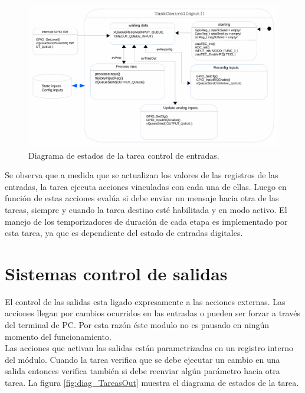 \begin{figure}[h!]
	\hspace{-0.5cm}
	\includegraphics[width=1.05\textwidth]{Figures/Cap_3/diagrama_tarea_input}
	\caption{ Diagrama de estados de la tarea control de entradas. }
	\label{fig:diag_TareasInp}
\end{figure}

Se observa que a medida que se actualizan los valores de las registros de las entradas, la tarea ejecuta acciones vinculadas con cada una de ellas. Luego en función de estas acciones evalúa si debe enviar un mensaje hacia otra de las tareas, siempre y cuando la tarea destino esté habilitada y en modo activo.
El manejo de los temporizadores de duración de cada etapa es implementado por esta tarea, ya que es dependiente del estado de entradas digitales.   

\section{ Sistemas control de salidas }
El control de las salidas esta ligado expresamente a las acciones externas. Las acciones llegan por cambios ocurridos en las entradas o pueden ser forzar a través del terminal de PC. Por esta razón éste modulo no es pausado en ningún momento del funcionamiento.\\
Las acciones que activan las salidas están parametrizadas en un registro interno del módulo. Cuando la tarea verifica que se debe ejecutar un cambio en una salida entonces verifica también si debe reenviar algún parámetro hacia otra tarea.
La figura \ref{fig:diag_TareasOut} muestra el diagrama de estados de la tarea.
 
